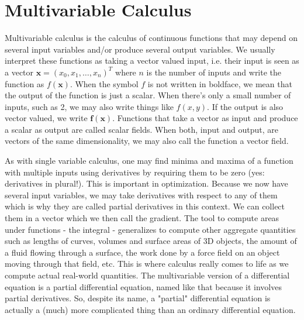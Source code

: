\chapter{Multivariable Calculus}
Multivariable calculus is the calculus of continuous functions that may depend on several input variables and/or produce several output variables. We usually interpret these functions as taking a vector valued input, i.e. their input is seen as a vector  $\mathbf{x} = (x_0,x_1,\ldots,x_n)^T$ where $n$ is the number of inputs and write the function as $f(\mathbf{x})$. When the symbol $f$ is not written in boldface, we mean that the output of the function is just a scalar. When there's only a small number of inputs, such as 2, we may also write things like $f(x,y)$. If the output is also vector valued, we write $\mathbf{f(x)}$. Functions that take a vector as input and produce a scalar as output are called scalar fields. When both, input and output, are vectors of the same dimensionality, we may also call the function a vector field.

\medskip
As with single variable calculus, one may find minima and maxima of a function with multiple inputs using derivatives by requiring them to be zero (yes: derivatives in plural!). This is important in optimization. Because we now have several input variables, we may take derivatives with respect to any of them which is why they are called partial derivatives in this context. We can collect them in a vector which we then call the gradient. The tool to compute areas under functions - the integral - generalizes to compute other aggregate quantities such as lengths of curves, volumes and surface areas of 3D objects, the amount of a fluid flowing through a surface, the work done by a force field on an object moving through that field, etc. This is where calculus really comes to life as we compute actual real-world quantities. The multivariable version of a differential equation is a partial differential equation, named like that because it involves partial derivatives. So, despite its name, a "partial" differential equation is actually a (much) more complicated thing than an ordinary differential equation. 

